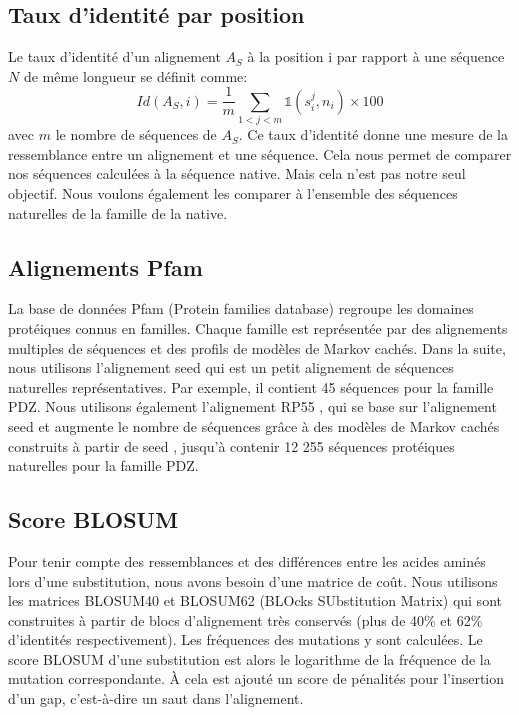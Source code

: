 \subsection{Taux d'identité par position}
\label{TauxID}
Le taux d'identité d'un alignement $A_S$ à la position i par rapport à une séquence $N$ de même longueur se définit comme:
\begin{equation}
Id(A_{S},i) = \frac{1}{m}\sum_{1<j<m} \mathds{1}(s_i^j,n_i) \times 100
\end{equation}
avec $m$ le nombre de séquences de $A_S$. Ce taux d'identité donne une mesure de la ressemblance entre un alignement et une séquence. Cela nous permet de comparer nos séquences calculées à la séquence native. Mais cela n'est pas notre seul objectif. Nous voulons également les comparer à l'ensemble des séquences naturelles de la famille de la native.  
\subsection{Alignements Pfam}
\label{sec:Align_Pfam}
La base de données Pfam (Protein families database) \cite{Punta12,Finn14} regroupe les domaines protéiques connus en familles. Chaque famille est représentée par des alignements multiples de séquences et des profils de modèles de Markov cachés. Dans la suite, nous utilisons l'alignement \og seed \fg qui est un petit alignement de séquences naturelles représentatives. Par exemple, il contient 45 séquences pour la famille PDZ. Nous utilisons également l'alignement \og RP55 \fg, qui se base sur l'alignement \og seed \fg et augmente le nombre de séquences grâce à des  modèles de Markov cachés construits à partir de \og seed \fg, jusqu'à contenir 12 255 séquences protéiques naturelles pour la famille PDZ.

\subsection{Score BLOSUM}

Pour tenir compte des ressemblances et des différences entre les acides aminés lors d'une substitution, nous avons besoin d'une matrice de coût. Nous utilisons les matrices BLOSUM40 et BLOSUM62 (BLOcks SUbstitution Matrix) \cite{Henikoff92} qui sont construites à partir de blocs d'alignement très conservés (plus de 40\% et 62\% d'identités respectivement). Les fréquences des mutations y sont calculées. Le score BLOSUM d'une substitution est alors le logarithme de la fréquence de la mutation correspondante. À cela est ajouté un score de pénalités pour l'insertion d'un gap, c'est-à-dire un saut dans l'alignement.

